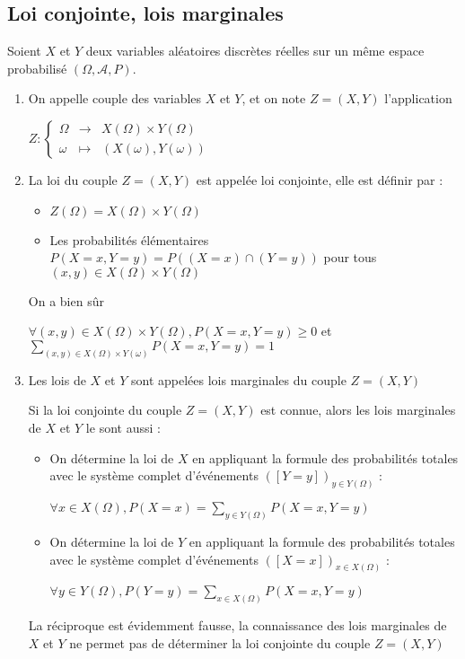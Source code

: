 \documentclass[a4paper,12pt]{book}
\newcommand{\Def}[2]{\begin{tcolorbox}[sharp corners, colback=white,colframe=blue!90!black!75, title=Définition : #1]#2\end{tcolorbox}}
\begin{document}
\subsection{Loi conjointe, lois marginales}
\Def{}{Soient $X$ et $Y$ deux variables aléatoires discrètes réelles sur un même espace probabilisé $(\Omega, \mathcal{A},P)$.\begin{enumerate}
\item On appelle couple des variables $X$ et $Y$, et on note $Z=(X,Y)$ l'application \par\begin{center}$Z:\left\{\begin{array}{rcl}\Omega & \to & X(\Omega)\times Y(\Omega) \\ \omega & \mapsto & (X(\omega), Y(\omega)) \end{array}\right.$\end{center}
\item La loi du couple $Z=(X,Y)$ est appelée loi conjointe, elle est définir par :\begin{itemize}
    \item $Z(\Omega)=X(\Omega)\times Y(\Omega)$
    \item Les probabilités élémentaires $P(X=x, Y=y)=P((X=x)\cap(Y=y))$ pour tous $(x,y)\in X(\Omega)\times Y(\Omega)$
\end{itemize} On a bien sûr \par\begin{center}$\forall (x,y)\in X(\Omega)\times Y(\Omega), P(X=x,Y=y)\geq 0$ et $\sum\limits_{(x,y)\in X(\Omega)\times Y(\omega)}P(X=x,Y=y)=1$\end{center}
\item Les lois de $X$ et $Y$ sont appelées lois marginales du couple $Z=(X,Y)$
\par Si la loi conjointe du couple $Z=(X,Y)$ est connue, alors les lois marginales de $X$ et $Y$ le sont aussi :\begin{itemize}
    \item On détermine la loi de $X$ en appliquant la formule des probabilités totales avec le système complet d'événements $([Y=y])_{y\in Y(\Omega)}$ :
    \par\begin{center}$\forall x\in X(\Omega), P(X=x)=\sum\limits_{y\in Y(\Omega)}P(X=x, Y=y)$\end{center}
    \item On détermine la loi de $Y$ en appliquant la formule des probabilités totales avec le système complet d'événements $([X=x])_{x\in X(\Omega)}$ :
    \par\begin{center}$\forall y\in Y(\Omega), P(Y=y)=\sum\limits_{x\in X(\Omega)}P(X=x, Y=y)$\end{center}
\end{itemize} La réciproque est évidemment fausse, la connaissance des lois marginales de $X$ et $Y$ ne permet pas de déterminer la loi conjointe du couple $Z=(X,Y)$
\end{enumerate}}
\end{document}
